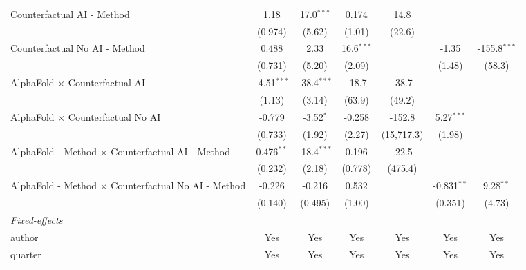 \begin{tabular}{lcccccc}
   Counterfactual AI - Method                                 & 1.18          & 17.0$^{***}$  & 0.174        & 14.8         &               &   \\   
                                                              & (0.974)       & (5.62)        & (1.01)       & (22.6)       &               &   \\   
   Counterfactual No AI - Method                              & 0.488         & 2.33          & 16.6$^{***}$ &              & -1.35         & -155.8$^{***}$\\   
                                                              & (0.731)       & (5.20)        & (2.09)       &              & (1.48)        & (58.3)\\   
   AlphaFold $\times$ Counterfactual AI                       & -4.51$^{***}$ & -38.4$^{***}$ & -18.7        & -38.7        &               &   \\   
                                                              & (1.13)        & (3.14)        & (63.9)       & (49.2)       &               &   \\   
   AlphaFold $\times$ Counterfactual No AI                    & -0.779        & -3.52$^{*}$   & -0.258       & -152.8       & 5.27$^{***}$  &   \\   
                                                              & (0.733)       & (1.92)        & (2.27)       & (15,717.3)   & (1.98)        &   \\   
   AlphaFold - Method $\times$ Counterfactual AI - Method     & 0.476$^{**}$  & -18.4$^{***}$ & 0.196        & -22.5        &               &   \\   
                                                              & (0.232)       & (2.18)        & (0.778)      & (475.4)      &               &   \\   
   AlphaFold - Method $\times$ Counterfactual No AI - Method  & -0.226        & -0.216        & 0.532        &              & -0.831$^{**}$ & 9.28$^{**}$\\   
                                                              & (0.140)       & (0.495)       & (1.00)       &              & (0.351)       & (4.73)\\   
   \midrule
   \emph{Fixed-effects}\\
   author                                                     & Yes           & Yes           & Yes          & Yes          & Yes           & Yes\\  
   quarter                                                    & Yes           & Yes           & Yes          & Yes          & Yes           & Yes\\  

\end{tabular}

